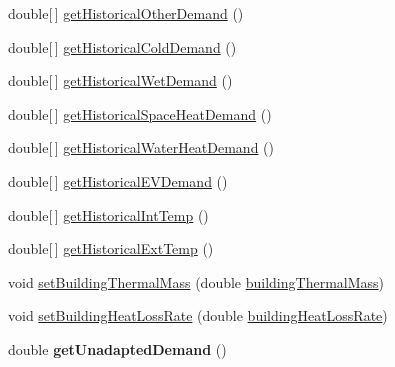 \begin{DoxyCompactItemize}
\item 
double\mbox{[}$\,$\mbox{]} \hyperlink{classuk_1_1ac_1_1dmu_1_1iesd_1_1cascade_1_1agents_1_1prosumers_1_1_household_prosumer_af192d28f2763dfeeab1be7e525de8ebb}{get\-Historical\-Other\-Demand} ()
\item 
double\mbox{[}$\,$\mbox{]} \hyperlink{classuk_1_1ac_1_1dmu_1_1iesd_1_1cascade_1_1agents_1_1prosumers_1_1_household_prosumer_a3a4d7c4a5cc2289f945ca2d12cb6671d}{get\-Historical\-Cold\-Demand} ()
\item 
double\mbox{[}$\,$\mbox{]} \hyperlink{classuk_1_1ac_1_1dmu_1_1iesd_1_1cascade_1_1agents_1_1prosumers_1_1_household_prosumer_a5ddfdc4b6192629e0f1196db08731879}{get\-Historical\-Wet\-Demand} ()
\item 
double\mbox{[}$\,$\mbox{]} \hyperlink{classuk_1_1ac_1_1dmu_1_1iesd_1_1cascade_1_1agents_1_1prosumers_1_1_household_prosumer_a2e26ad564548d24560bec586c7d61e06}{get\-Historical\-Space\-Heat\-Demand} ()
\item 
double\mbox{[}$\,$\mbox{]} \hyperlink{classuk_1_1ac_1_1dmu_1_1iesd_1_1cascade_1_1agents_1_1prosumers_1_1_household_prosumer_ace4a1871421a17a2e08c93c059bf89d3}{get\-Historical\-Water\-Heat\-Demand} ()
\item 
double\mbox{[}$\,$\mbox{]} \hyperlink{classuk_1_1ac_1_1dmu_1_1iesd_1_1cascade_1_1agents_1_1prosumers_1_1_household_prosumer_a1017a1f255c0890847af057bbf89a4ee}{get\-Historical\-E\-V\-Demand} ()
\item 
double\mbox{[}$\,$\mbox{]} \hyperlink{classuk_1_1ac_1_1dmu_1_1iesd_1_1cascade_1_1agents_1_1prosumers_1_1_household_prosumer_a16ffe2310bb4950c59c262f3bc8b0056}{get\-Historical\-Int\-Temp} ()
\item 
double\mbox{[}$\,$\mbox{]} \hyperlink{classuk_1_1ac_1_1dmu_1_1iesd_1_1cascade_1_1agents_1_1prosumers_1_1_household_prosumer_ae60d6f1871cd04e5583b0e10d8bd9643}{get\-Historical\-Ext\-Temp} ()
\item 
void \hyperlink{classuk_1_1ac_1_1dmu_1_1iesd_1_1cascade_1_1agents_1_1prosumers_1_1_household_prosumer_afdddfe492d52aa30318bc83faa413ca8}{set\-Building\-Thermal\-Mass} (double \hyperlink{classuk_1_1ac_1_1dmu_1_1iesd_1_1cascade_1_1agents_1_1prosumers_1_1_household_prosumer_a111416f336c008417a0bcc1e767a2db1}{building\-Thermal\-Mass})
\item 
void \hyperlink{classuk_1_1ac_1_1dmu_1_1iesd_1_1cascade_1_1agents_1_1prosumers_1_1_household_prosumer_af845c18daaa9d115084592174af95a59}{set\-Building\-Heat\-Loss\-Rate} (double \hyperlink{classuk_1_1ac_1_1dmu_1_1iesd_1_1cascade_1_1agents_1_1prosumers_1_1_household_prosumer_a98d6038003235b3f82cf20a630c7219d}{building\-Heat\-Loss\-Rate})
\item 
\hypertarget{classuk_1_1ac_1_1dmu_1_1iesd_1_1cascade_1_1agents_1_1prosumers_1_1_household_prosumer_ad4849618780b49a8bdb64c455c0daa9d}{double {\bfseries get\-Unadapted\-Demand} ()}\label{classuk_1_1ac_1_1dmu_1_1iesd_1_1cascade_1_1agents_1_1prosumers_1_1_household_prosumer_ad4849618780b49a8bdb64c455c0daa9d}


\end{DoxyCompactItemize}
